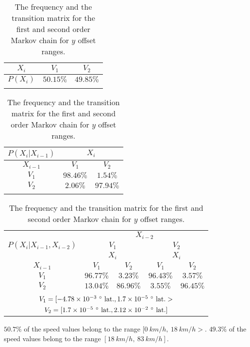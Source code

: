 \documentclass[preprint,12pt]{elsarticle}
\begin{document}
\begin{table}[!ht]
\centering
\begin{tabular}{|c|c|c|}
\hline
$X_{i}$ & $V_{1}$ & $V_{2}$\\ \hline
$P(X_{i})$ & $50.15\%$ & $49.85\%$\\ \hline
\multicolumn{3}{c}{}\\
\end{tabular}

\begin{tabular}{|c|c|c|}
\hline
$P(X_{i}|X_{i-1})$ & \multicolumn{2}{|c|}{$X_{i}$}\\ \hline
$X_{i-1}$ & $V_{1}$ & $V_{2}$\\ \hline
$V_{1}$ & $98.46\%$ & $1.54\%$\\ \hline
$V_{2}$ & $2.06\%$ & $97.94\%$\\ \hline
\multicolumn{3}{c}{}\\
\end{tabular}

\begin{tabular}{|c|c|c|c|c|}
\hline
\multirow{3}{*}{$P(X_{i}|X_{i-1},X_{i-2})$} & \multicolumn{4}{|c|}{$X_{i-2}$}\\ \cline{2-5}
 & \multicolumn{2}{|c|}{$V_{1}$} & \multicolumn{2}{|c|}{$V_{2}$}\\ \cline{2-5}
 & \multicolumn{2}{|c|}{$X_{i}$} & \multicolumn{2}{|c|}{$X_{i}$}\\ \hline
$X_{i-1}$ & $V_{1}$ & $V_{2}$ & $V_{1}$ & $V_{2}$\\ \hline
$V_{1}$ & $96.77\%$ & $3.23\%$ & $96.43\%$ & $3.57\%$\\ \hline
$V_{2}$ & $13.04\%$ & $86.96\%$ & $3.55\%$ & $96.45\%$\\ \hline
\multicolumn{5}{c}{}\\
\multicolumn{5}{c}{$V_{1} = [-4.78 \times 10^{-3} \ \degree \  \mathrm{lat.}, 1.7 \times 10^{-5} \ \degree \  \mathrm{lat.}>$}\\
\multicolumn{5}{c}{$V_{2} = [1.7 \times 10^{-5} \ \degree \  \mathrm{lat.}, 2.12 \times 10^{-2} \ \degree \  \mathrm{lat.}]$}\\
\end{tabular}
\caption{The frequency and the transition matrix for the first and second order Markov chain for $y$ offset ranges.}
\label{tab:latitude_no_abs}
\end{table}

$50.7\%$ of the speed values belong to the range $[0 \ km/h, \ 18 \ km/h>$. $49.3\%$ of the speed values belong to the range $[18 \ km/h, \ 83 \ km/h]$.
\end{document}
